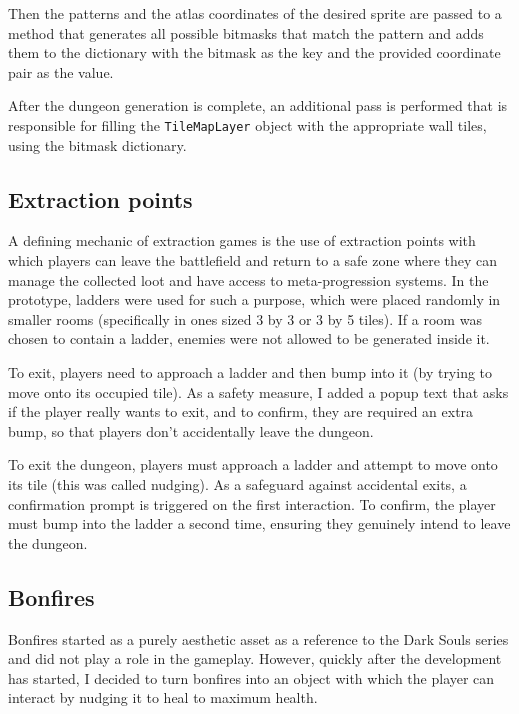 Then the patterns and the atlas coordinates of the desired sprite are passed to a method that generates all possible bitmasks that match the pattern and adds them to the dictionary with the bitmask as the key and the provided coordinate pair as the value.

After the dungeon generation is complete, an additional pass is performed that is responsible for filling the \verb|TileMapLayer| object with the appropriate wall tiles, using the bitmask dictionary.



\subsection{Extraction points}

A defining mechanic of extraction games is the use of extraction points with which players can leave the battlefield and return to a safe zone where they can manage the collected loot and have access to meta-progression systems. In the prototype, ladders were used for such a purpose, which were placed randomly in smaller rooms (specifically in ones sized 3 by 3 or 3 by 5 tiles). If a room was chosen to contain a ladder, enemies were not allowed to be generated inside it.

To exit, players need to approach a ladder and then bump into it (by trying to move onto its occupied tile). As a safety measure, I added a popup text that asks if the player really wants to exit, and to confirm, they are required an extra bump, so that players don't accidentally leave the dungeon.

To exit the dungeon, players must approach a ladder and attempt to move onto its tile (this was called nudging). As a safeguard against accidental exits, a confirmation prompt is triggered on the first interaction. To confirm, the player must bump into the ladder a second time, ensuring they genuinely intend to leave the dungeon.



\subsection{Bonfires}

Bonfires started as a purely aesthetic asset as a reference to the Dark Souls\cite{darksouls2011} series and did not play a role in the gameplay. However, quickly after the development has started, I decided to turn bonfires into an object with which the player can interact by nudging it to heal to maximum health.

